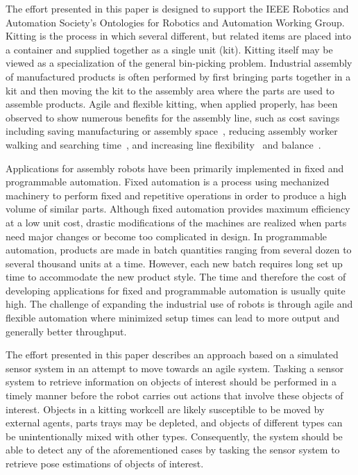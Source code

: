 The effort presented in this paper is designed to support the IEEE Robotics and Automation Society's Ontologies for Robotics and Automation Working Group.
Kitting is the process in which several different, but related items are placed into a container and supplied together as a single unit (kit).
Kitting itself may be viewed as a specialization of the general bin-picking problem. Industrial assembly of manufactured products is often performed by first
bringing parts together in a kit and then moving the kit to the assembly area where the parts are used to assemble products. Agile and flexible kitting, when
applied properly, has been observed to show numerous benefits for the assembly line, such as cost savings~\cite{Carlsson_2008} including saving manufacturing or
assembly space~\cite{Medbo2003}, reducing assembly worker walking and searching time~\cite{Schwind1992}, and increasing line flexibility~\cite{Bozer1992} and
balance~\cite{Jiao2000}.

Applications for assembly robots have been primarily implemented in fixed and programmable automation. Fixed automation is a process using mechanized machinery
to perform fixed and repetitive operations in order to produce a high volume of similar parts. Although fixed automation provides maximum efficiency at a low unit
cost, drastic modifications of the machines are realized when parts need major changes or become too complicated in design. In programmable automation, products
are made in batch quantities ranging from several dozen to several thousand units at a time. However, each new batch requires long set up time to accommodate the
new product style. The time and therefore the cost of developing applications for fixed and programmable automation is usually quite high. The challenge of expanding
the industrial use of robots is through agile and flexible automation where minimized setup times can lead to more output and generally better throughput.

The effort presented in this paper describes an approach based on a simulated sensor system in an attempt to move towards an agile system. Tasking a sensor system
to retrieve information on objects of interest should be performed in a timely manner before the robot carries out actions that involve these objects of interest.
Objects in a kitting workcell are likely susceptible to be moved by external agents, parts trays may be depleted, and objects of different types can be
unintentionally mixed with other types. Consequently, the system should be able to detect any of the aforementioned cases by tasking the sensor system to
retrieve pose estimations of objects of interest.

